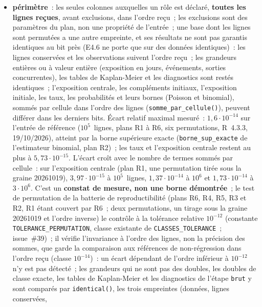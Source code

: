 \documentclass[a4paper,11pt]{article}
\newcommand{\code}[1]{\texttt{\small #1}}
\begin{document}
\begin{itemize}[leftmargin=*, itemsep=2pt]
  \item \textbf{périmètre}~: les seules colonnes auxquelles un rôle est déclaré,
    \textbf{toutes les lignes reçues}, avant exclusions, dans l'ordre reçu~;
    les exclusions sont des paramètres du plan, non une propriété de
    l'entrée~; une base dont les lignes sont permutées a une autre empreinte, et ses
    résultats ne sont pas garantis identiques au bit près (E4.6 ne porte que
    sur des données identiques)~: les lignes conservées et les observations
    suivent l'ordre reçu~; les grandeurs entières ou à valeur entière
    (exposition en jours, événements, sorties concurrentes), les tables de
    Kaplan-Meier et les diagnostics sont restés identiques~; l'exposition
    centrale, les compléments initiaux, l'exposition initiale, les taux, les
    probabilités et leurs bornes (Poisson et binomial), sommés par cellule
    dans l'ordre des lignes (\code{somme\_par\_cellule()}), peuvent différer
    dans les derniers bits. Écart relatif maximal mesuré~: $1{,}6 \cdot
    10^{-14}$ sur l'entrée de référence ($10^5$~lignes, plans R1 à R6, six
    permutations, R~4.3.3, 19/10/2026), atteint par la borne supérieure
    exacte (\code{borne\_sup\_exacte} de l'estimateur binomial, plan R2)~; les taux et l'exposition
    centrale restent au plus à $5{,}73 \cdot 10^{-15}$. L'écart croît avec
    le nombre de termes sommés par cellule~: sur l'exposition centrale (plan
    R1, une permutation tirée sous la graine 20261019),
    $3{,}97 \cdot 10^{-15}$ à $10^5$~lignes, $1{,}37 \cdot 10^{-14}$ à
    $10^6$ et $1{,}73 \cdot 10^{-14}$ à $3 \cdot 10^6$. C'est un \textbf{constat de
    mesure, non une borne démontrée}~; le test de permutation de la batterie
    de reproductibilité (plans R6, R4, R5, R3 et R2, R1 étant couvert par
    R6~; deux permutations, un tirage sous la graine 20261019 et l'ordre
    inverse) le contrôle à la tolérance relative $10^{-12}$ (constante
    \code{TOLERANCE\_PERMUTATION}, classe existante de
    \code{CLASSES\_TOLERANCE}~; issue~\#39)~; il vérifie l'invariance à
    l'ordre des lignes, non la précision des sommes, que garde la
    comparaison aux références de non-régression dans l'ordre reçu (classe
    $10^{-14}$)~: un écart dépendant de l'ordre inférieur à $10^{-12}$ n'y
    est pas détecté~; les grandeurs qui ne sont pas des
    doubles, les doubles de classe exacte, les tables de Kaplan-Meier et les
    diagnostics de l'étape \code{brut} y sont comparés par
    \code{identical()}, les trois empreintes (données, lignes conservées,

\end{itemize}
\end{document}
